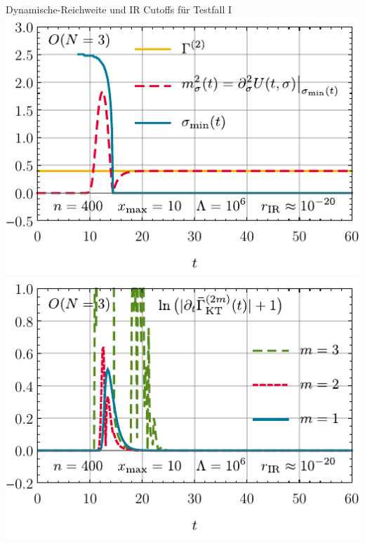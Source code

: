 \begin{frame}{Dynamische-Reichweite und IR Cutoffs für Testfall I}
	\label{0dkrange}
	\centering
	\includegraphics[width=0.47\framewidth]{../0d/figures/sc_i_on_3_n_400_xmax_10_lambda_1e6_tir_60_mass_minimum.pdf}\hspace{.5cm}
	\includegraphics[width=0.47\framewidth]{../0d/figures/sc_i_on_3_n_400_xmax_10_lambda_1e6_tir_60_changing_rates.pdf} 
\end{frame}


